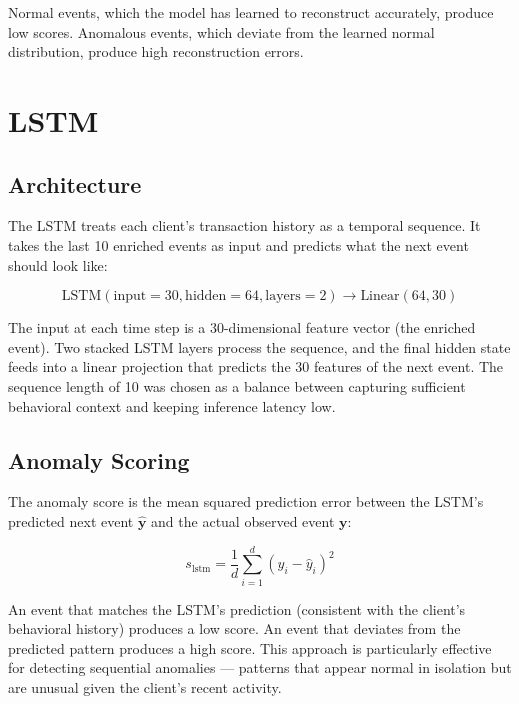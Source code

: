 Normal events, which the model has learned to reconstruct accurately, produce
low scores. Anomalous events, which deviate from the learned normal
distribution, produce high reconstruction errors.

\section{LSTM}

\subsection{Architecture}

The LSTM treats each client's transaction history as a temporal sequence.
It takes the last 10 enriched events as input and predicts what the next
event should look like:

\begin{equation}
\text{LSTM}(\text{input}=30, \text{hidden}=64, \text{layers}=2)
\rightarrow \text{Linear}(64, 30)
\end{equation}

The input at each time step is a 30-dimensional feature vector (the enriched
event). Two stacked LSTM layers process the sequence, and the final hidden
state feeds into a linear projection that predicts the 30 features of the
next event. The sequence length of 10 was chosen as a balance between
capturing sufficient behavioral context and keeping inference latency low.

\subsection{Anomaly Scoring}

The anomaly score is the mean squared prediction error between the LSTM's
predicted next event $\hat{\mathbf{y}}$ and the actual observed event
$\mathbf{y}$:

\begin{equation}
s_{\text{lstm}} = \frac{1}{d} \sum_{i=1}^{d} (y_i - \hat{y}_i)^2
\end{equation}

An event that matches the LSTM's prediction (consistent with the client's
behavioral history) produces a low score. An event that deviates from the
predicted pattern produces a high score. This approach is particularly
effective for detecting sequential anomalies --- patterns that appear normal
in isolation but are unusual given the client's recent activity.

